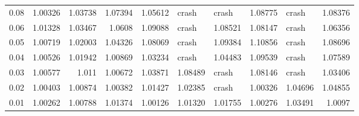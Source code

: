 \documentclass[compress]{beamer}
\begin{document}
\begin{frame}[t]
\begin{table}[H]
\begin{tabular}{rrrrrllrlr}
  0.08 & 1.00326 & 1.03738 & 1.07394 & 1.05612 & crash   & crash   & 1.08775 & crash   & 1.08376 \\
  0.06 & 1.01328 & 1.03467 & 1.0608  & 1.09088 & crash   & 1.08521 & 1.08147 & crash   & 1.06356 \\
  0.05 & 1.00719 & 1.02003 & 1.04326 & 1.08069 & crash   & 1.09384 & 1.10856 & crash   & 1.08696 \\
  0.04 & 1.00526 & 1.01942 & 1.00869 & 1.03234 & crash   & 1.04483 & 1.09539 & crash   & 1.07589 \\
  0.03 & 1.00577 & 1.011   & 1.00672 & 1.03871 & 1.08489 & crash   & 1.08146 & crash   & 1.03406 \\
  0.02 & 1.00403 & 1.00874 & 1.00382 & 1.01427 & 1.02385 & crash   & 1.00326 & 1.04696 & 1.04855 \\
  0.01 & 1.00262 & 1.00788 & 1.01374 & 1.00126 & 1.01320 & 1.01755 & 1.00276 & 1.03491 & 1.0097  \\
\hline
\end{tabular}
\end{table}
\end{frame}
\end{document}
